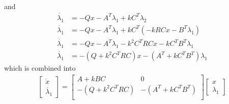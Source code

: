 and
\begin{equation}
    \begin{split}
        \dot{\lambda_1}&=-Qx-A^T\lambda_1+kC^T\lambda_2\\
        \dot{\lambda_1}&=-Qx-A^T\lambda_1+kC^T(-kRCx-B^T\lambda_1)\\
        \dot{\lambda_1}&=-Qx-A^T\lambda_1-k^2C^TRCx-kC^TB^T\lambda_1\\
        \dot{\lambda_1}&=-(Q+k^2C^TRC)x-(A^T+kC^TB^T)\lambda_1
    \end{split}
\end{equation}
which is combined into 
\begin{equation}
    \begin{split}
        \begin{bmatrix}
            \dot{x}\\\dot{\lambda_1}
        \end{bmatrix}=
        \begin{bmatrix}
            A+kBC& 0\\
            -(Q+k^2C^TRC)& -(A^T+kC^TB^T)\\
        \end{bmatrix}\begin{bmatrix}
            x\\\lambda_1
        \end{bmatrix}
    \end{split}
\end{equation}



